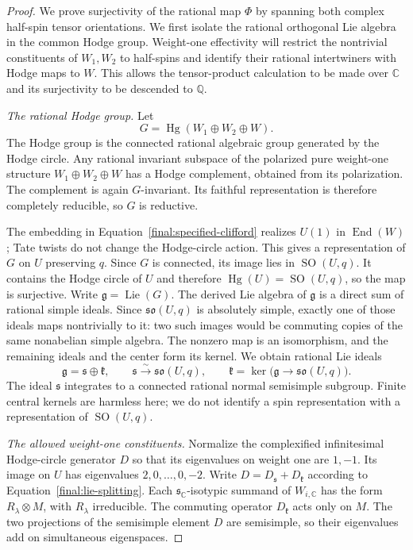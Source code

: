 \documentclass[11pt]{amsart}
\newcommand{\Q}{\mathbb Q}
\newcommand{\C}{\mathbb C}
\DeclareMathOperator{\Hg}{Hg}
\DeclareMathOperator{\End}{End}
\DeclareMathOperator{\SO}{SO}
\theoremstyle{definition}
\theoremstyle{remark}
\numberwithin{equation}{section}
\begin{document}
\begin{proof}
We prove surjectivity of the rational map $\Phi$ by spanning both
complex half-spin tensor orientations.  We first isolate
the rational orthogonal Lie algebra in the common Hodge group.
Weight-one effectivity will restrict the nontrivial constituents of
$W_1,W_2$ to half-spins and identify their rational intertwiners with
Hodge maps to $W$.  This allows the tensor-product
calculation to be made over $\C$ and its surjectivity to be descended
to $\Q$.

\emph{The rational Hodge group.}
Let
\[
 G=\Hg(W_1\oplus W_2\oplus W).
\]
The Hodge group is the connected rational algebraic group generated
by the Hodge circle.  Any rational invariant subspace of the
polarized pure weight-one structure $W_1\oplus W_2\oplus W$ has a
Hodge complement, obtained from its polarization.  The complement
is again $G$-invariant.  Its faithful representation is therefore
completely reducible, so $G$ is reductive.

The embedding in Equation~\eqref{final:specified-clifford} realizes
$U(1)$ in $\End(W)$; Tate twists do not change the Hodge-circle
action.  This gives a representation of $G$ on $U$ preserving $q$.
Since $G$ is connected, its image lies in $\SO(U,q)$.  It contains
the Hodge circle of $U$ and therefore $\Hg(U)=\SO(U,q)$, so the map
is surjective.  Write $\mathfrak g=\operatorname{Lie}(G)$.
The derived Lie algebra of $\mathfrak g$ is a direct sum of rational
simple ideals.  Since $\mathfrak{so}(U,q)$ is absolutely simple,
exactly one of those ideals maps nontrivially to it: two such images
would be commuting copies of the same nonabelian simple algebra.
The nonzero map is an isomorphism, and the remaining ideals and the
center form its kernel.  We obtain rational Lie ideals
\begin{equation}\label{final:lie-splitting}
 \mathfrak g=\mathfrak s\oplus\mathfrak k,
 \qquad
 \mathfrak s\xrightarrow{\sim}\mathfrak{so}(U,q),
 \qquad
 \mathfrak k=\ker\bigl(\mathfrak g\to\mathfrak{so}(U,q)\bigr).
\end{equation}
The ideal $\mathfrak s$ integrates to a connected rational normal
semisimple subgroup.  Finite central kernels are harmless here; we do
not identify a spin representation with a representation of
$\SO(U,q)$.

\emph{The allowed weight-one constituents.}
Normalize the complexified infinitesimal Hodge-circle generator $D$
so that its eigenvalues on weight one are $1,-1$.  Its image on $U$ has
eigenvalues $2,0,\ldots,0,-2$.  Write
$D=D_{\mathfrak s}+D_{\mathfrak k}$ according to
Equation~\eqref{final:lie-splitting}.  Each $\mathfrak s_\C$-isotypic
summand of $W_{i,\C}$ has the form $R_\lambda\otimes M$, with
$R_\lambda$ irreducible.  The commuting operator
$D_{\mathfrak k}$ acts only on $M$.  The two projections of the
semisimple element $D$ are semisimple, so their eigenvalues add on
simultaneous eigenspaces.


\end{proof}
\end{document}
